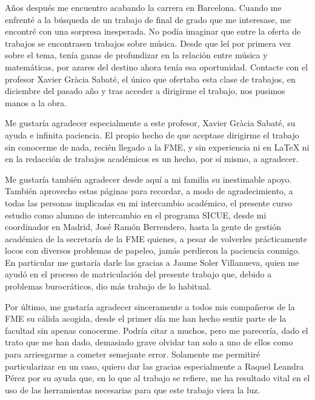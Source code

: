\documentclass[11pt,a4paper]{article}
\begin{document}
    Años después me encuentro acabando la carrera en Barcelona. Cuando me enfrenté a la búsqueda de un trabajo de final de grado que me interesase, me encontré con una sorpresa inesperada. No podía imaginar que entre la oferta de trabajos se encontrasen trabajos sobre música. Desde que leí por primera vez sobre el tema, tenía ganas de profundizar en la relación entre música y matemáticas, por azares del destino ahora tenía esa oportunidad. Contacte con el profesor Xavier Gràcia Sabaté, el único que ofertaba esta clase de trabajos, en diciembre del pasado año y tras acceder a dirigirme el trabajo, nos pusimos manos a la obra.
    
    Me gustaría agradecer especialmente a este profesor, Xavier Gràcia Sabaté, su ayuda e infinita paciencia. El propio hecho de que aceptase dirigirme el trabajo sin conocerme de nada, recién llegado a la FME, y sin experiencia ni en \LaTeX{} ni en la redacción de trabajos académicos es un hecho, por sí mismo, a agradecer.
    
    Me gustaría también agradecer desde aquí a mi familia su inestimable apoyo. También aprovecho estas páginas para recordar, a modo de agradecimiento, a todas las personas implicadas en mi intercambio académico, el presente curso estudio como alumno de intercambio en el programa SICUE, desde mi coordinador en Madrid, José Ramón Berrendero, hasta la gente de gestión académica de la secretaría de la FME quienes, a pesar de volverles prácticamente locos con diversos problemas de papeleo, jamás perdieron la paciencia conmigo. En particular me gustaría darle las gracias a Jaume Soler Villanueva, quien me ayudó en el proceso de matriculación del presente trabajo que, debido a problemas burocráticos, dio más trabajo de lo habitual.
    
    Por último, me gustaría agradecer sinceramente a todos mis compañeros de la FME su cálida acogida, desde el primer día me han hecho sentir parte de la facultad sin apenas conocerme. Podría citar a muchos, pero me parecería, dado el trato que me han dado, demasiado grave olvidar tan solo a uno de ellos como para arriesgarme a cometer semejante error. Solamente me permitiré particularizar en un caso, quiero dar las gracias especialmente a Raquel Leandra Pérez por su ayuda que, en lo que al trabajo se refiere, me ha resultado vital en el uso de las herramientas necesarias para que este trabajo viera la luz.
    
        
\newpage
\clearpage\null\thispagestyle{empty}\newpage %
\end{document}
